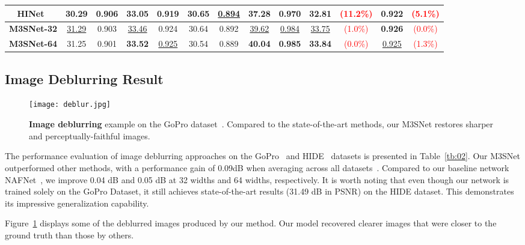 \documentclass[sn-mathphys,Numbered]{sn-jnl}
\theoremstyle{thmstyleone}\newtheorem{theorem}{Theorem}\newtheorem{proposition}[theorem]{Proposition}
\theoremstyle{thmstyletwo}\newtheorem{example}{Example}\newtheorem{remark}{Remark}
\theoremstyle{thmstylethree}\newtheorem{definition}{Definition}
\begin{document}
\begin{sidewaystable}
\begin{tabular}{ccccccccc||cccc}
     \\
      HINet~\cite{Chen_2021_CVPR}  & 30.29 & 0.906 & 33.05&  0.919   & 30.65 & \underline{0.894}  & 37.28 & 0.970 & 32.81 &\textcolor{red}{(11.2\%)} & 0.922&\textcolor{red}{(5.1\%)}
     \\
\hline
      \textbf{M3SNet-32}  & \underline{31.29} & 0.903 & \underline{33.46}& 0.924   & 30.64 & 0.892  & \underline{39.62} & \underline{0.984} & \underline{33.75}   &\textcolor{red}{(1.0\%)} & \textbf{0.926}&\textcolor{red}{(0.0\%)}
      \\
      \textbf{M3SNet-64}  & 31.25 & 0.901 & \textbf{33.52} &  \underline{0.925}  & 30.54 & 0.889  & \textbf{40.04} & \textbf{0.985} & \textbf{33.84} &\textcolor{red}{(0.0\%)} & \underline{0.925}&\textcolor{red}{(1.3\%)}
    \\
    \hline
\end{tabular}
\end{sidewaystable}



\subsection{Image Deblurring Result}

\begin{figure} \centerline{\texttt{[image: deblur.jpg]}}
	\caption{\textbf{Image deblurring} example on the GoPro dataset~\cite{Gopro}. Compared to the state-of-the-art methods, our M3SNet
restores sharper and perceptually-faithful images.}
	\label{fig:07}
\end{figure}

The performance evaluation of image deblurring approaches on the GoPro~\cite{Gopro} and HIDE~\cite{HIDE} datasets is presented in Table~\ref{tb:02}. Our M3SNet outperformed other methods, with a performance gain of 0.09dB when averaging across all datasets~\cite{Gopro,HIDE}. Compared to our baseline network NAFNet~\cite{chen2022simple}, we improve 0.04 dB and 0.05 dB at 32 widths and 64 widths, respectively. It is worth noting that even though our network is trained solely on the GoPro Dataset, it still achieves state-of-the-art results (31.49 dB in PSNR) on the HIDE dataset. This demonstrates its impressive generalization capability.

Figure~\ref{fig:07} displays some of the deblurred images produced by our  method. Our model recovered clearer images that were closer to the ground truth than those by others.
\end{document}
